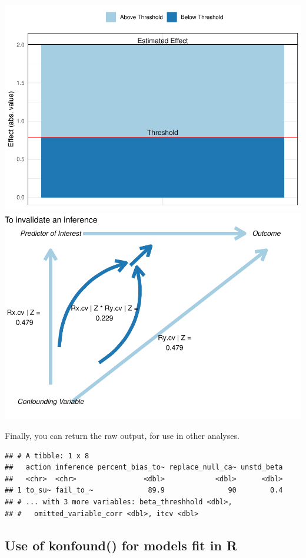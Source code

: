 \documentclass[man]{apa6}
\theoremstyle{definition}
\theoremstyle{definition}
\theoremstyle{definition}
\theoremstyle{remark}
\begin{document}
\includegraphics{papaja_files/figure-latex/unnamed-chunk-8-1.pdf}
\includegraphics{papaja_files/figure-latex/unnamed-chunk-8-2.pdf}

Finally, you can return the raw output, for use in other analyses.

\begin{verbatim}
## # A tibble: 1 x 8
##   action inference percent_bias_to~ replace_null_ca~ unstd_beta
##   <chr>  <chr>                <dbl>            <dbl>      <dbl>
## 1 to_su~ fail_to_~             89.9               90        0.4
## # ... with 3 more variables: beta_threshhold <dbl>,
## #   omitted_variable_corr <dbl>, itcv <dbl>
\end{verbatim}

\subsection{Use of konfound() for models fit in
R}\label{use-of-konfound-for-models-fit-in-r}
\end{document}
